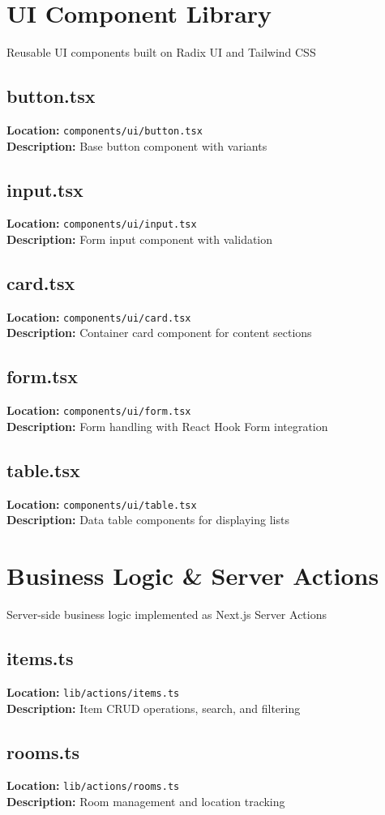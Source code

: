 \documentclass[11pt,twoside,openright]{book}
\newcommand{\filepath}[1]{\texttt{#1}}
\newcommand{\codesection}[3]{
    \section{#1}
    \textbf{Location:} \filepath{#2}\\
    \textbf{Description:} #3\\
}
\begin{document}
\cleardoublepage
\chapter{UI Component Library}

Reusable UI components built on Radix UI and Tailwind CSS


\codesection{button.tsx}{components/ui/button.tsx}{Base button component with variants}



\clearpage


\codesection{input.tsx}{components/ui/input.tsx}{Form input component with validation}



\clearpage


\codesection{card.tsx}{components/ui/card.tsx}{Container card component for content sections}



\clearpage


\codesection{form.tsx}{components/ui/form.tsx}{Form handling with React Hook Form integration}



\clearpage


\codesection{table.tsx}{components/ui/table.tsx}{Data table components for displaying lists}



\clearpage


\cleardoublepage
\chapter{Business Logic \& Server Actions}

Server-side business logic implemented as Next.js Server Actions


\codesection{items.ts}{lib/actions/items.ts}{Item CRUD operations, search, and filtering}



\clearpage


\codesection{rooms.ts}{lib/actions/rooms.ts}{Room management and location tracking}
\end{document}
